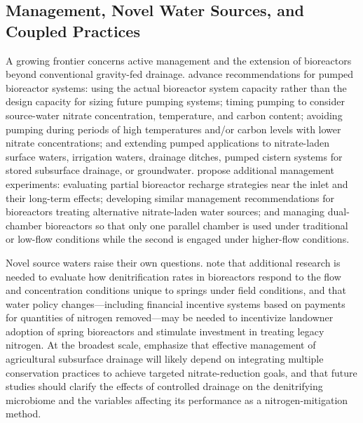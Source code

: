 \subsection{Management, Novel Water Sources, and Coupled Practices}
A growing frontier concerns active management and the extension of bioreactors beyond conventional gravity-fed drainage. \textcite{Hartfiel2023} advance recommendations for pumped bioreactor systems: using the actual bioreactor system capacity rather than the design capacity for sizing future pumping systems; timing pumping to consider source-water nitrate concentration, temperature, and carbon content; avoiding pumping during periods of high temperatures and/or carbon levels with lower nitrate concentrations; and extending pumped applications to nitrate-laden surface waters, irrigation waters, drainage ditches, pumped cistern systems for stored subsurface drainage, or groundwater. \textcite{Hartfiel2023b} propose additional management experiments: evaluating partial bioreactor recharge strategies near the inlet and their long-term effects; developing similar management recommendations for bioreactors treating alternative nitrate-laden water sources; and managing dual-chamber bioreactors so that only one parallel chamber is used under traditional or low-flow conditions while the second is engaged under higher-flow conditions.

Novel source waters raise their own questions. \textcite{Easton2019} note that additional research is needed to evaluate how denitrification rates in bioreactors respond to the flow and concentration conditions unique to springs under field conditions, and that water policy changes---including financial incentive systems based on payments for quantities of nitrogen removed---may be needed to incentivize landowner adoption of spring bioreactors and stimulate investment in treating legacy nitrogen. At the broadest scale, \textcite{Wang2025b} emphasize that effective management of agricultural subsurface drainage will likely depend on integrating multiple conservation practices to achieve targeted nitrate-reduction goals, and that future studies should clarify the effects of controlled drainage on the denitrifying microbiome and the variables affecting its performance as a nitrogen-mitigation method.

